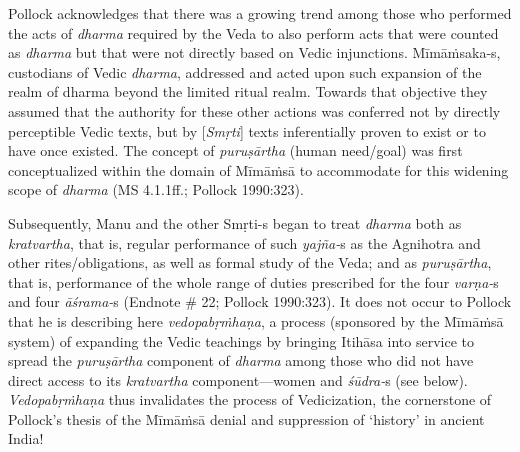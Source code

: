 Pollock acknowledges that there was a growing trend among those who performed the acts of \textit{dharma} required by the Veda to also perform acts that were counted as \textit{dharma} but that were not directly based on Vedic injunctions. Mīmāṁsaka-s, custodians of Vedic \textit{dharma}, addressed and acted upon such expansion of the realm of dharma beyond the limited ritual realm. Towards that objective they assumed that the authority for these other actions was conferred not by directly perceptible Vedic texts, but by [\textit{Smṛti}] texts inferentially proven to exist or to have once existed. The concept of \textit{puruṣārtha} (human need/goal) was first conceptualized within the domain of Mīmāṁsā to accommodate for this widening scope of \textit{dharma} (MS 4.1.1ff.; Pollock 1990:323).

Subsequently, Manu and the other Smṛti-s began to treat \textit{dharma} both as \textit{kratvartha}, that is, regular performance of such \textit{yajña-}s as the Agnihotra and other rites/obligations, as well as formal study of the Veda; and as \textit{puruṣārtha}, that is, performance of the whole range of duties prescribed for the four \textit{varṇa-}s and four \textit{āśrama-}s (Endnote \# 22; Pollock 1990:323). It does not occur to Pollock that he is describing here \textit{vedopabṛṁhaṇa}, a process (sponsored by the Mīmāṁsā system) of expanding the Vedic teachings by bringing Itihāsa into service to spread the \textit{puruṣārtha} component of \textit{dharma} among those who did not have direct access to its \textit{kratvartha} component—women and \textit{śūdra-}s (see below). \textit{Vedopabṛṁhaṇa} thus invalidates the process of Vedicization, the cornerstone of Pollock’s thesis of the Mīmāṁsā denial and suppression of ‘history’ in ancient India! 

